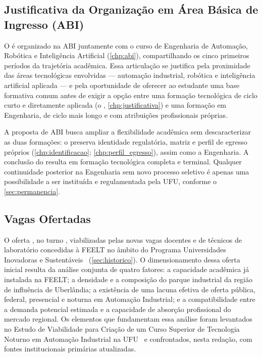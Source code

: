 \subsection{Justificativa da Organização em Área Básica de Ingresso (ABI)}

O \ppccurso é organizado na ABI juntamente com o curso de Engenharia de Automação, Robótica e Inteligência Artificial (\autoref{chp:abi}), compartilhando os cinco primeiros períodos da trajetória acadêmica. Essa articulação se justifica pela proximidade das áreas tecnológicas envolvidas — automação industrial, robótica e inteligência artificial aplicada — e pela oportunidade de oferecer ao estudante uma base formativa comum antes de exigir a opção entre uma formação tecnológica de ciclo curto e diretamente aplicada (o \ppccurso, \autoref{chp:justificativa}) e uma formação em Engenharia, de ciclo mais longo e com atribuições profissionais próprias.

A proposta de ABI busca ampliar a flexibilidade acadêmica sem descaracterizar as duas formações: o \ppccurso preserva identidade regulatória, matriz e perfil de egresso próprios (\autoref{chp:identificacao}; \autoref{chp:perfil_egresso}), assim como a Engenharia. A conclusão do \ppccurso resulta em formação tecnológica completa e terminal. Qualquer continuidade posterior na Engenharia sem novo processo seletivo é apenas uma possibilidade a ser instituída e regulamentada pela UFU, conforme o \autoref{sec:permanencia}.

\subsection{Vagas Ofertadas}

O \ppccurso oferta \textbf{\ppcvagasofertadas}, no turno \ppcturno, viabilizadas pelas novas vagas docentes e de técnicos de laboratório concedidas à FEELT no âmbito do Programa Universidades Inovadoras e Sustentáveis~\cite{programa_universidades_inovadoras_sustentaveis} (\autoref{sec:historico}). O dimensionamento dessa oferta inicial resulta da análise conjunta de quatro fatores: a capacidade acadêmica já instalada na FEELT; a densidade e a composição do parque industrial da região de influência de Uberlândia; a existência de uma lacuna efetiva de oferta pública, federal, presencial e noturna em Automação Industrial; e a compatibilidade entre a demanda potencial estimada e a capacidade de absorção profissional do mercado regional. Os elementos que fundamentam essa análise foram levantados no Estudo de Viabilidade para Criação de um Curso Superior de Tecnologia Noturno em Automação Industrial na UFU~\cite{ufu_estudo_viabilidade_cst_2026} e confrontados, nesta redação, com fontes institucionais primárias atualizadas.

